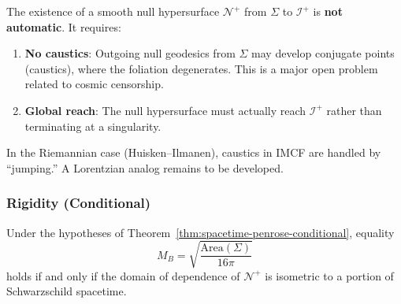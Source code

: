 \begin{remark}
\label{rem:foliation-existence}
The existence of a smooth null hypersurface $\mathcal{N}^+$ from $\Sigma$ to $\mathscr{I}^+$ is \textbf{not automatic}. It requires:
\begin{enumerate}[label=(\alph*)]
\item \textbf{No caustics}: Outgoing null geodesics from $\Sigma$ may develop conjugate points (caustics), where the foliation degenerates. This is a major open problem related to cosmic censorship.
\item \textbf{Global reach}: The null hypersurface must actually reach $\mathscr{I}^+$ rather than terminating at a singularity.
\end{enumerate}
In the Riemannian case (Huisken--Ilmanen), caustics in IMCF are handled by ``jumping.'' A Lorentzian analog remains to be developed.
\end{remark}

\subsubsection{Rigidity (Conditional)}

\begin{theorem}
\label{thm:rigidity-conditional}
Under the hypotheses of Theorem~\ref{thm:spacetime-penrose-conditional}, equality
\begin{equation}
M_B = \sqrt{\frac{\mathrm{Area}(\Sigma)}{16\pi}}
\end{equation}
holds if and only if the domain of dependence of $\mathcal{N}^+$ is isometric to a portion of Schwarzschild spacetime.
\end{theorem}

